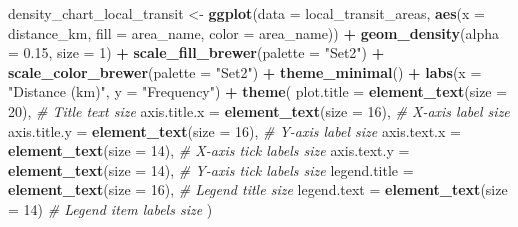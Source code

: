 \documentclass[
]{article}
\newenvironment{Shaded}{\begin{snugshade}}{\end{snugshade}}
\newcommand{\AttributeTok}[1]{\textcolor[rgb]{0.13,0.29,0.53}{#1}}
\newcommand{\CommentTok}[1]{\textcolor[rgb]{0.56,0.35,0.01}{\textit{#1}}}
\newcommand{\DecValTok}[1]{\textcolor[rgb]{0.00,0.00,0.81}{#1}}
\newcommand{\FloatTok}[1]{\textcolor[rgb]{0.00,0.00,0.81}{#1}}
\newcommand{\FunctionTok}[1]{\textcolor[rgb]{0.13,0.29,0.53}{\textbf{#1}}}
\newcommand{\NormalTok}[1]{#1}
\newcommand{\OtherTok}[1]{\textcolor[rgb]{0.56,0.35,0.01}{#1}}
\newcommand{\SpecialCharTok}[1]{\textcolor[rgb]{0.81,0.36,0.00}{\textbf{#1}}}
\newcommand{\StringTok}[1]{\textcolor[rgb]{0.31,0.60,0.02}{#1}}
\begin{document}
\begin{Shaded}
\begin{Highlighting}[]
\NormalTok{density\_chart\_local\_transit }\OtherTok{\textless{}{-}} \FunctionTok{ggplot}\NormalTok{(}\AttributeTok{data =}\NormalTok{ local\_transit\_areas, }\FunctionTok{aes}\NormalTok{(}\AttributeTok{x =}\NormalTok{ distance\_km, }\AttributeTok{fill =}\NormalTok{ area\_name, }\AttributeTok{color =}\NormalTok{ area\_name)) }\SpecialCharTok{+}
  \FunctionTok{geom\_density}\NormalTok{(}\AttributeTok{alpha =} \FloatTok{0.15}\NormalTok{, }\AttributeTok{size =} \DecValTok{1}\NormalTok{) }\SpecialCharTok{+} 
  \FunctionTok{scale\_fill\_brewer}\NormalTok{(}\AttributeTok{palette =} \StringTok{"Set2"}\NormalTok{) }\SpecialCharTok{+} 
  \FunctionTok{scale\_color\_brewer}\NormalTok{(}\AttributeTok{palette =} \StringTok{"Set2"}\NormalTok{) }\SpecialCharTok{+} 
  \FunctionTok{theme\_minimal}\NormalTok{() }\SpecialCharTok{+}
  \FunctionTok{labs}\NormalTok{(}\AttributeTok{x =} \StringTok{"Distance (km)"}\NormalTok{, }\AttributeTok{y =} \StringTok{"Frequency"}\NormalTok{) }\SpecialCharTok{+} 
  \FunctionTok{theme}\NormalTok{(}
  \AttributeTok{plot.title =} \FunctionTok{element\_text}\NormalTok{(}\AttributeTok{size =} \DecValTok{20}\NormalTok{),       }\CommentTok{\# Title text size}
  \AttributeTok{axis.title.x =} \FunctionTok{element\_text}\NormalTok{(}\AttributeTok{size =} \DecValTok{16}\NormalTok{),      }\CommentTok{\# X{-}axis label size}
  \AttributeTok{axis.title.y =} \FunctionTok{element\_text}\NormalTok{(}\AttributeTok{size =} \DecValTok{16}\NormalTok{),      }\CommentTok{\# Y{-}axis label size}
  \AttributeTok{axis.text.x =} \FunctionTok{element\_text}\NormalTok{(}\AttributeTok{size =} \DecValTok{14}\NormalTok{),       }\CommentTok{\# X{-}axis tick labels size}
  \AttributeTok{axis.text.y =} \FunctionTok{element\_text}\NormalTok{(}\AttributeTok{size =} \DecValTok{14}\NormalTok{),       }\CommentTok{\# Y{-}axis tick labels size}
  \AttributeTok{legend.title =} \FunctionTok{element\_text}\NormalTok{(}\AttributeTok{size =} \DecValTok{16}\NormalTok{),      }\CommentTok{\# Legend title size}
  \AttributeTok{legend.text =} \FunctionTok{element\_text}\NormalTok{(}\AttributeTok{size =} \DecValTok{14}\NormalTok{)        }\CommentTok{\# Legend item labels size}
\NormalTok{  )}


\end{Highlighting}
\end{Shaded}
\end{document}
